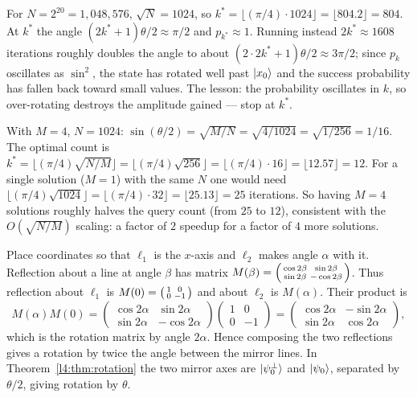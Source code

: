 \begin{solution}
For $N=2^{20}=1{,}048{,}576$, $\sqrt N=1024$, so
$k^{\ast}=\lfloor(\pi/4)\cdot1024\rfloor=\lfloor 804.2\rfloor=804$. At $k^{\ast}$ the
angle $(2k^{\ast}+1)\theta/2\approx\pi/2$ and $p_{k^{\ast}}\approx1$. Running instead
$2k^{\ast}\approx1608$ iterations roughly doubles the angle to about
$(2\cdot2k^{\ast}+1)\theta/2\approx 3\pi/2$; since $p_k$ oscillates as $\sin^2$, the
state has rotated well past $\ket{x_0}$ and the success probability has fallen back
toward small values. The lesson: the probability oscillates in $k$, so over-rotating
destroys the amplitude gained --- stop at $k^{\ast}$.
\end{solution}

\begin{solution}
With $M=4$, $N=1024$: $\sin(\theta/2)=\sqrt{M/N}=\sqrt{4/1024}=\sqrt{1/256}=1/16$.
The optimal count is
$k^{\ast}=\lfloor(\pi/4)\sqrt{N/M}\rfloor=\lfloor(\pi/4)\sqrt{256}\rfloor
=\lfloor(\pi/4)\cdot16\rfloor=\lfloor12.57\rfloor=12$. For a single solution
($M=1$) with the same $N$ one would need
$\lfloor(\pi/4)\sqrt{1024}\rfloor=\lfloor(\pi/4)\cdot32\rfloor=\lfloor25.13\rfloor=25$
iterations. So having $M=4$ solutions roughly halves the query count (from $25$ to
$12$), consistent with the $O(\sqrt{N/M})$ scaling: a factor of $2$ speedup for a
factor of $4$ more solutions.
\end{solution}

\begin{solution}
Place coordinates so that $\ell_1$ is the $x$-axis and $\ell_2$ makes angle $\alpha$
with it. Reflection about a line at angle $\beta$ has matrix
$M(\beta)=\begin{psmallmatrix}\cos2\beta&\sin2\beta\\\sin2\beta&-\cos2\beta\end{psmallmatrix}$.
Thus reflection about $\ell_1$ is
$M(0)=\begin{psmallmatrix}1&0\\0&-1\end{psmallmatrix}$
and about $\ell_2$ is $M(\alpha)$. Their product is
\[
  M(\alpha)M(0)
   =\begin{pmatrix}\cos2\alpha&\sin2\alpha\\ \sin2\alpha&-\cos2\alpha\end{pmatrix}
    \begin{pmatrix}1&0\\0&-1\end{pmatrix}
   =\begin{pmatrix}\cos2\alpha&-\sin2\alpha\\ \sin2\alpha&\cos2\alpha\end{pmatrix},
\]
which is the rotation matrix by angle $2\alpha$. Hence composing the two reflections
gives a rotation by twice the angle between the mirror lines. In
Theorem~\ref{l4:thm:rotation} the two mirror axes are $\ket{\psi_0^{\perp}}$ and
$\ket{\psi_0}$, separated by $\theta/2$, giving rotation by $\theta$.
\end{solution}
